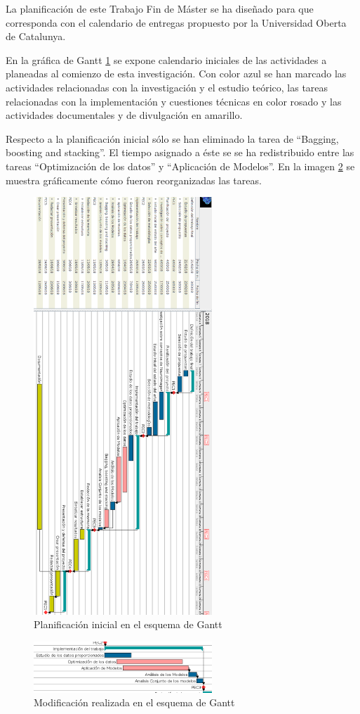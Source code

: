 La planificación de este Trabajo Fin de Máster se ha diseñado para que corresponda con el calendario de entregas propuesto por la Universidad Oberta de Catalunya.

En la gráfica de Gantt \ref{figure:gantt} se expone calendario iniciales de las actividades a planeadas al comienzo de esta investigación. Con color azul se han marcado las actividades relacionadas con la investigación y el estudio teórico, las tareas relacionadas con la implementación y cuestiones técnicas en color rosado y las actividades documentales y de divulgación en amarillo.

Respecto a la planificación inicial sólo se han eliminado la tarea de ``Bagging, boosting and stacking''. El tiempo asignado a éste se se ha redistribuido entre las tareas ``Optimización de los datos'' y ``Aplicación de Modelos''. En la imagen \ref{figure:ganttmod} se muestra gráficamente cómo fueron reorganizadas las tareas.

\begin{figure}[ht]
\centering
\includegraphics[width=0.6\textwidth]{figs/planificacion/gantt.png}
\caption{Planificación inicial en el esquema de Gantt}
\label{figure:gantt}
\end{figure}

\begin{figure}[H]
\centering
\includegraphics[width=0.6\textwidth]{figs/planificacion/modificacion.png}
\caption{Modificación realizada en el esquema de Gantt}
\label{figure:ganttmod}
\end{figure}